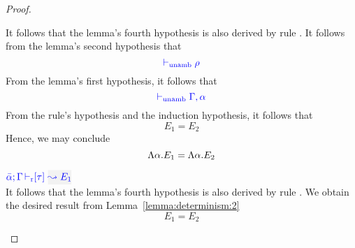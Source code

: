\begin{proof}
\begin{description}
It follows that the lemma's fourth hypothesis is also derived by rule
. It follows from the lemma's second hypothesis that 
\begin{equation*}
  {\color{blue}  \vdash_{\mathrm{unamb}}\rho}
\end{equation*}
From the lemma's first hypothesis, it follows that
\begin{equation*}
  {\color{blue}  \vdash_{\mathrm{unamb}}\Gamma, \alpha}
\end{equation*}
From the rule's hypothesis and the induction hypothesis, it follows that
\begin{equation*}
  E_1 = E_2
\end{equation*}
Hence, we may conclude
\begin{equation*}
  \Lambda \alpha. E_1 = \Lambda \alpha. E_2
\end{equation*}

\item[\fbox{\rref{R-Simp}}]\quad$\drres{\bar{\alpha}}{\tenv}{\type}{E_1}$ \\

It follows that the lemma's fourth hypothesis is also derived by rule
. We obtain the desired result from Lemma~\ref{lemma:determinism:2}
\begin{equation*}
  E_1 = E_2
\end{equation*}

\end{description}
\end{proof}

{\centering
{}}

